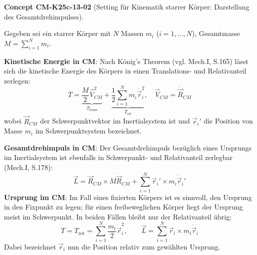 \documentclass[10pt, letterpaper]{article}
\newcommand{\CustomHeading}[3]{%
  \par\medskip\noindent%
  \textbf{#1 #2} \textnormal{(#3)}.\enskip%
}
\newenvironment{CONC}[2]{\begin{unitbox}\CustomHeading{Concept}{#1}{#2}}{\end{unitbox}}
\begin{document}
\begin{CONC}{CM-K25c-13-02}{Setting für Kinematik starrer Körper: Darstellung des Gesamtdrehimpulses}
Gegeben sei ein starrer Körper mit $N$ Massen $m_i$ ($i = 1,\dots,N$), Gesamtmasse $M = \sum_{i=1}^N m_i$. 

\textbf{Kinetische Energie in CM}: Nach König’s Theorem (vgl. Mech.I, S.165) lässt sich die kinetische Energie des Körpers in einen Translations- und Relativanteil zerlegen:
\[
T = \underbrace{\frac{M}{2} \vec{V}_{CM}^2}_{T_{\text{trans}}} + \underbrace{\frac{1}{2} \sum_{i=1}^N m_i \dot{\vec{r}}_i^2}_{T_{\text{rel}}}, \quad \vec{V}_{CM} = \dot{\vec{R}}_{CM}
\]
wobei $\vec{R}_{CM}$ der Schwerpunktvektor im Inertialsystem ist und $\vec{r}_i'$ die Position von Masse $m_i$ im Schwerpunktsystem bezeichnet.

\textbf{Gesamtdrehimpuls in CM}: Der Gesamtdrehimpuls bezüglich eines Ursprungs im Inertialsystem ist ebenfalls in Schwerpunkt- und Relativanteil zerlegbar (Mech.I, S.178):
\[
\vec{L} = \vec{R}_{CM} \times M \dot{\vec{R}}_{CM} + \sum_{i=1}^N \vec{r}_i' \times m_i \dot{\vec{r}}_i'
\]
\textbf{Ursprung im CM}: Im Fall eines fixierten Körpers ist es sinnvoll, den Ursprung in den Fixpunkt zu legen; für einen freibeweglichen Körper liegt der Ursprung meist im Schwerpunkt. In beiden Fällen bleibt nur der Relativanteil übrig:
\[
T = T_{\text{rot}} = \sum_{i=1}^N \frac{m_i}{2} \dot{\vec{r}}_i^2, \qquad
\vec{L} = \sum_{i=1}^N \vec{r}_i \times m_i \dot{\vec{r}}_i
\]
Dabei bezeichnet $\vec{r}_i$ nun die Position relativ zum gewählten Ursprung. 


\end{CONC}
\end{document}
